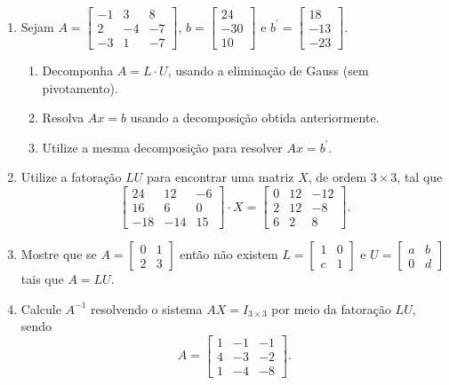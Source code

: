 \documentclass[12pt,a4paper]{article}
\newcommand{\IconCalc}{\texttt{[image: calculator.png]}}
\newlength{\SmileysLength}
\newcommand{\calc}{\hspace*{-\SmileysLength}\makebox[0pt][r]{\IconCalc}%
   \hspace*{\SmileysLength}}
\begin{document}
\begin{enumerate}
\item %
Sejam $A =
\begin{bmatrix}
-1 &  3 &  8 \\
 2 & -4 & -7 \\
-3 &  1 & -7
\end{bmatrix}$, $b =
\begin{bmatrix}
 24 \\
-30 \\
 10
\end{bmatrix}$ e $b^\prime =
\begin{bmatrix}
 18 \\
-13 \\
-23
\end{bmatrix}$.
\begin{enumerate}
\item Decomponha $A = L \cdot U$, usando a eliminação de Gauss (sem pivotamento).
\item Resolva $Ax = b$ usando a decomposição obtida anteriormente.
\item Utilize a mesma decomposição para resolver $Ax = b^\prime$.
\end{enumerate}

\item %
Utilize a fatoração $LU$ para encontrar uma matriz $X$, de ordem $3 \times 3$, tal que
\[
\begin{bmatrix}
 24 &  12 & -6\\
 16 &   6 &  0\\
-18 & -14 & 15
\end{bmatrix}
\cdot X
=
\begin{bmatrix}
0&12&-12\\
2&12&-8\\
6&2&8
\end{bmatrix}.
\]

\item Mostre que se $A =\begin{bmatrix}
0 & 1\\
2 & 3
\end{bmatrix}$ então não existem $L = \begin{bmatrix}
1 & 0\\
c & 1
\end{bmatrix}$ e $U = \begin{bmatrix}
a & b\\
0 & d
\end{bmatrix}$ tais que $A=LU$.

\item %
Calcule $A^{-1}$ resolvendo o sistema $A X = I_{3 \times 3}$ por meio da fatoração $LU$, sendo
\[
A =
\begin{bmatrix}
1&-1&-1\\
4&-3&-2\\
1&-4&-8
\end{bmatrix}.
\]


\end{enumerate}
\end{document}
